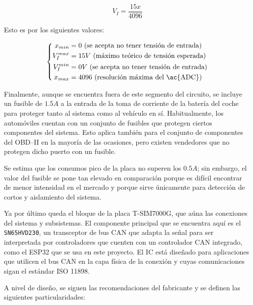 \begin{equation*}
  V_I = \frac{15x}{4096}
\end{equation*}

Esto es por los siguientes valores:

\begin{equation*}
  \left\{
  \begin{aligned}
    x_{min}   & = 0~\text{(se acepta no tener tensión de entrada)}  \\
    V_I^{max} & = 15V~\text{(máximo teórico de tensión esperada)}   \\
    V_I^{min} & = 0V~\text{(se acepta no tener tensión de entrada)} \\
    x_{max}   & = 4096~\text{(resolución máxima del \ac{ADC})}
  \end{aligned}
  \right.
\end{equation*}

Finalmente, aunque se encuentra fuera de este segmento del circuito, se incluye un
fusible de $1.5A$ a la entrada de la toma de corriente de la batería del coche
para proteger tanto al sistema como al vehículo en sí. Habitualmente, los automóviles
cuentan con un conjunto de fusibles que protegen ciertos componentes del sistema. Esto
aplica también para el conjunto de componentes del \ac{OBD}--II en la mayoría de las
ocasiones, pero existen vendedores que no protegen dicho puerto con un fusible.

Se estima que los consumos pico de la placa no superen los $0.5A$; sin embargo, el valor
del fusible se pone tan elevado en comparación porque es difícil encontrar de menor
intensidad en el mercado y porque sirve únicamente para detección de cortos y aislamiento
del sistema.

Ya por último queda el bloque de la placa T-SIM7000G, que aúna las conexiones del sistema
y subsistemas. El componente principal que se encuentra aquí es el \texttt{SN65HVD230},
un transceptor de bus \ac{CAN} que adapta la señal para ser interpretada por
controladores que cuenten con un controlador \ac{CAN} integrado, como el ESP32
que se usa en este proyecto. El IC está diseñado para aplicaciones que utilicen
el bus \ac{CAN} en la capa física de la conexión y cuyas comunicaciones sigan
el estándar ISO 11898.

A nivel de diseño, se siguen las recomendaciones del fabricante y se definen las
siguientes particularidades:

